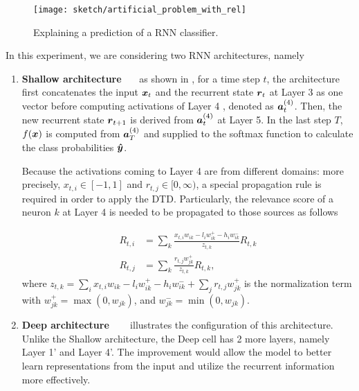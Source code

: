  \begin{figure}[!hbt]
		\centering
		\texttt{[image: sketch/artificial\_problem\_with\_rel]}
		\caption{Explaining a prediction of a RNN classifier.} 
		\label{fig:artificial_problem}
\end{figure}


\begin{figure}[!htb]
\centering

     \hfill
{}
\end{figure}

In this experiment, we are considering two RNN architectures, namely

\begin{enumerate}
	\item \textbf{Shallow architecture}  \ \ \ as shown in \addfigure{\ref{fig:shallow_arch}}, for a time step $t$, the  architecture first concatenates the input $\patvector{x}_t$  and the recurrent state $\patvector{r}_t$ at Layer 3 as one vector before computing activations of Layer 4 , denoted as $\patvector{a}_t^{(4)}$. Then,  the new recurrent state $\patvector{r}_{t+1}$  is derived from $\patvector{a}_t^{(4)}$ at Layer 5. In the last step $T$, $f(\boldsymbol{x})$ is computed from $\patvector{a}^{(4)}_{T}$ and supplied to the softmax function to calculate the class probabilities $\patvector{\hat{y}}$. 
		
Because the activations coming to  Layer 4 are from different domains: more precisely, $x_{t,i} \in [-1, 1]$ and $r_{t,j} \in [0, \infty) $, a special propagation rule is required in order to apply the DTD. Particularly, the relevance score of a neuron $k$ at Layer 4 is needed to be propagated to those sources as follows
		
\begin{align*}
	R_{t, i} &= \sum_k \frac{x_{t, i} w_{ik} - l_i w_{ik}^+ - h_i w_{ik}^-}{z_{t,k}}  R_{t,k} \\	
     R_{t, j} &= \sum_k \frac{r_{t, j} w_{jk}^+}{z_{t,k}}  R_{t,k},
\end{align*}
where $z_{t,k} =  \sum_i x_{t,i} w_{ik} - l_i w_{ik}^+ - h_i w_{ik}^- + \sum_j r_{t,j} w_{jk}^+ $ is the normalization term with $w_{jk}^+ = \max(0, w_{jk})$, and $w_{jk}^- = \min(0, w_{jk})$.

	\item \textbf{Deep architecture} \ \ \ \addfigure{\ref{fig:deep_arch}} illustrates the configuration of this architecture. Unlike the Shallow architecture, the Deep cell has 2 more layers, namely Layer 1' and Layer 4'.  The improvement would allow the model to better learn representations from the input and utilize the recurrent information more effectively.
\end{enumerate}

